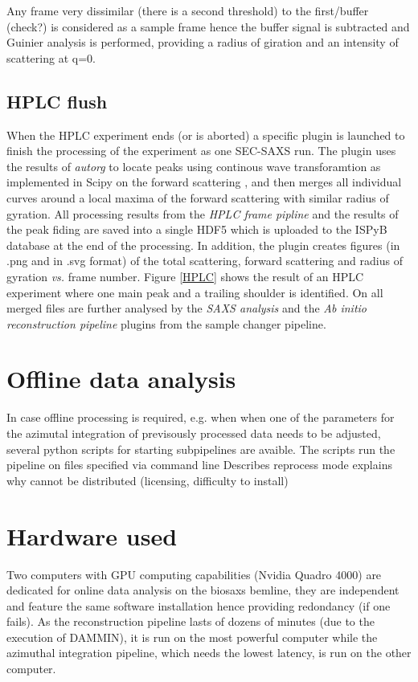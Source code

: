 \documentclass[preprint,pdf]{iucr}              %
\begin{document}
Any frame very dissimilar (there is a second threshold) to the first/buffer
(check?) is considered as a sample frame hence the buffer signal is subtracted
and Guinier analysis is performed, providing a radius of giration and an
intensity of scattering at q=0.
 
\subsection{HPLC flush}
When the HPLC experiment ends (or is aborted) a specific plugin is launched to
finish the processing of the experiment as one SEC-SAXS run. The plugin uses the results of \textit{autorg} to locate peaks using continous wave transforamtion as implemented in Scipy on the forward scattering \cite{cwt,scipy}, and then merges all individual curves around a local maxima of the forward scattering with similar radius of gyration. All processing results from the \textit{HPLC frame pipline} and the results of the peak fiding are
saved into a single HDF5 which is uploaded to the ISPyB database at the end of the processing. In addition, the plugin creates figures (in .png and in .svg format) of the total scattering, forward scattering and radius of gyration \textit{vs.} frame number. Figure \ref{HPLC} shows the result of an HPLC
experiment where one main peak and a trailing shoulder is identified.
On all merged files are further analysed by the \textit{SAXS analysis} and the \textit{Ab initio reconstruction pipeline} plugins from the sample changer pipeline.

\section{Offline data analysis}
In case offline processing is required, e.g. when when one of the parameters for the azimutal integration of previsously processed data needs to be adjusted, several python scripts for starting subpipelines are avaible. The scripts run the pipeline on files specified via command line   Describes reprocess mode 
explains why cannot be distributed (licensing, difficulty to install)
 
\section{Hardware used}
Two computers with GPU computing capabilities (Nvidia Quadro 4000) are dedicated
for online data analysis on the biosaxs bemline, they are independent and
feature the same software installation hence providing redondancy (if one
fails).
As the  reconstruction pipeline lasts of dozens of minutes
(due to the execution of DAMMIN), it is run on the most powerful computer while 
the azimuthal integration pipeline, which needs the lowest latency, is run on
the other computer.
\end{document}
